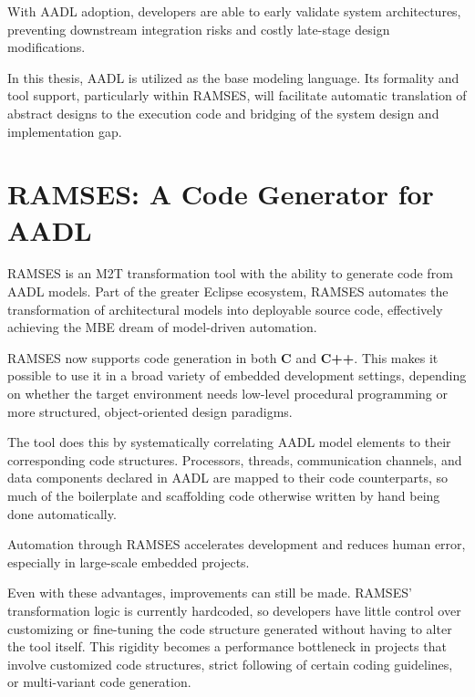 \begin{tcolorbox}[colback=blue!5, colframe=blue!40!black] With \gls{AADL} adoption, developers are able to early validate system architectures, preventing downstream integration risks and costly late-stage design modifications.  \end{tcolorbox}

\par
In this thesis, \gls{AADL} is utilized as the base modeling language. Its formality and tool support, particularly within RAMSES, will facilitate automatic translation of abstract designs to the execution code and bridging of the system design and implementation gap.


\section{RAMSES: A Code Generator for AADL} \label{sec:ramses}
\label{sec:ramsesIntro}

\gls{RAMSES} is an \gls{M2T} transformation tool with the ability to generate code from \gls{AADL} models. Part of the greater Eclipse ecosystem, \gls{RAMSES} automates the transformation of architectural models into deployable source code, effectively achieving the \gls{MBE} dream of model-driven automation\cite{MEM4CSD}.
\par 
\gls{RAMSES} now supports code generation in both \textbf{C} and \textbf{C++}. This makes it possible to use it in a broad variety of embedded development settings, depending on whether the target environment needs low-level procedural programming or more structured, object-oriented design paradigms.
\par 
The tool does this by systematically correlating \gls{AADL} model elements to their corresponding code structures. Processors, threads, communication channels, and data components declared in \gls{AADL} are mapped to their code counterparts, so much of the boilerplate and scaffolding code otherwise written by hand being done automatically.

\begin{tcolorbox}[colback=green!5, colframe=green!40!black] Automation through \gls{RAMSES} accelerates development and reduces human error, especially in large-scale embedded projects. \end{tcolorbox}

Even with these advantages, improvements can still be made. \gls{RAMSES}' transformation logic is currently hardcoded, so developers have little control over customizing or fine-tuning the code structure generated without having to alter the tool itself. This rigidity becomes a performance bottleneck in projects that involve customized code structures, strict following of certain coding guidelines, or multi-variant code generation.


